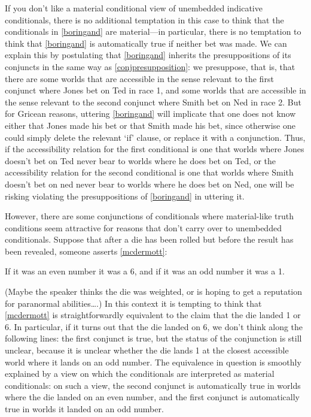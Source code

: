 \documentclass[If.tex]{subfiles}
\begin{document}
If you don't like a material conditional view of unembedded indicative conditionals, there is no additional temptation in this case to think that the conditionals in \ref{boringand} are material---in particular, there is no temptation to think that \ref{boringand} is automatically true if neither bet was made.  We can explain this by postulating that \ref{boringand} inherits the presuppositions of its conjuncts in the same way as \ref{conjpresupposition}: we presuppose, that is, that there are some worlds that are accessible in the sense relevant to the first conjunct where Jones bet on Ted in race 1, and some worlds that are accessible in the sense relevant to the second conjunct where Smith bet on Ned in race 2.  But for Gricean reasons, uttering \ref{boringand} will implicate that one does not know either that Jones made his bet or that Smith made his bet, since otherwise one could simply delete the relevant ‘if’ clause, or replace it with a conjunction.  Thus, if the accessibility relation for the first conditional is one that worlds where Jones doesn't bet on Ted never bear to worlds where he does bet on Ted, or the  accessibility relation for the second conditional is one that worlds where Smith doesn't bet on ned never bear to worlds where he does bet on Ned, one will be risking violating the presuppositions of \ref{boringand} in uttering it.  

However, there are some conjunctions of conditionals where material-like truth conditions seem attractive for reasons that don't carry over to unembedded conditionals.  Suppose that after a die has been rolled but before the result has been revealed, someone asserts \ref{mcdermott}:
\begin{prop}
	\nitem \label{mcdermott}
	If it was an even number it was a 6, and if it was an odd number it was a 1.
\end{prop}
(Maybe the speaker thinks the die was weighted, or is hoping to get a reputation for  paranormal abilities….)  In this context it is tempting to think that \ref{mcdermott} is straightforwardly equivalent to the claim that the die landed 1 or 6.  In particular, if it turns out that the die landed on 6, we don't think along the following lines: the first conjunct is true, but the status of the conjunction is still unclear, because it is unclear whether the die lands 1 at the closest accessible world where it lands on an odd number.  The equivalence in question is smoothly explained by a view on which the conditionals are interpreted as material conditionals: on such a view, the second conjunct is automatically true in worlds where the die landed on an even number, and the first conjunct is automatically true in worlds it landed on an odd number.  
\end{document}
